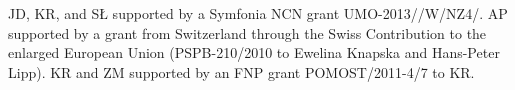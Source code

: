 JD, KR, and SŁ supported by a Symfonia NCN grant UMO-2013//\allowbreak W/\allowbreak NZ4/. 
AP supported by a grant from Switzerland
through the Swiss Contribution to the enlarged European Union (PSPB-210/2010
to Ewelina Knapska and Hans-Peter Lipp).
KR and ZM supported by an FNP grant POMOST/2011-4/7 to KR.
